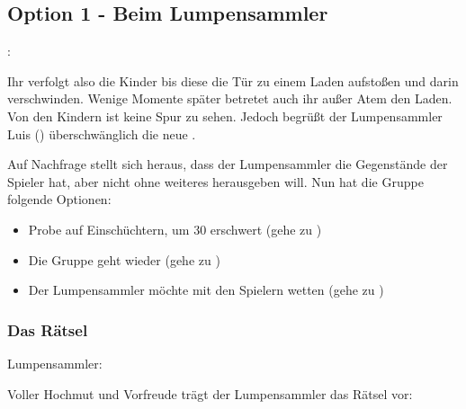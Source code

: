 \subsection{Option 1 - Beim Lumpensammler}
\label{eingeholt}

:

Ihr verfolgt also die Kinder bis diese die Tür zu einem Laden aufstoßen und darin verschwinden. Wenige Momente später betretet auch ihr außer Atem den Laden. Von den Kindern ist keine Spur zu sehen. Jedoch begrüßt der Lumpensammler Luis (\blue{\ref{Lumpensammler}}) überschwänglich die neue .

Auf Nachfrage stellt sich heraus, dass der Lumpensammler die Gegenstände der Spieler hat, aber nicht ohne weiteres herausgeben will. Nun hat die Gruppe folgende Optionen:

\begin{itemize}
  \item Probe auf Einschüchtern, um 30 erschwert (gehe zu \blue{\ref{fertig}})
  \item Die Gruppe geht wieder (gehe zu \blue{\ref{neingeholt}})
  \item Der Lumpensammler möchte mit den Spielern wetten (gehe zu \blue{\ref{wette}})
\end{itemize}



\subsubsection{Das Rätsel}
\label{wette}

Lumpensammler: 

Voller Hochmut und Vorfreude trägt der Lumpensammler das Rätsel vor:

